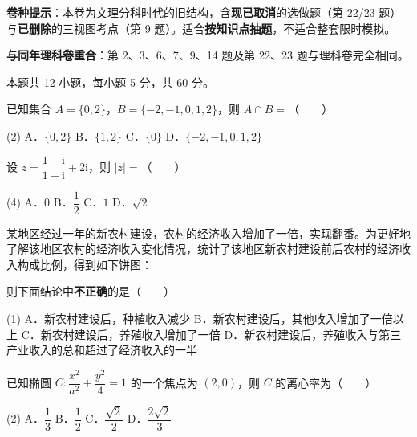 

\begin{gknotice}
\textbf{ 卷种提示}：本卷为文理分科时代的旧结构，含\textbf{现已取消}的选做题（第 22/23 题）与\textbf{已删除}的三视图考点（第 9 题）。适合\textbf{按知识点抽题}，不适合整套限时模拟。

\textbf{与同年理科卷重合}：第 2、3、6、7、9、14 题及第 22、23 题与理科卷完全相同。
\end{gknotice}

\par\medskip


\begin{gktip}
本题共 12 小题，每小题 5 分，共 60 分。
\end{gktip}

已知集合 $A=\{0,2\}$，$B=\{-2,-1,0,1,2\}$，则 $A\cap B=$（　　）

\begin{gkopts}(2)
\task A．$\{0,2\}$
\task B．$\{1,2\}$
\task C．$\{0\}$
\task D．$\{-2,-1,0,1,2\}$
\end{gkopts}

设 $z=\dfrac{1-\mathrm i}{1+\mathrm i}+2\mathrm i$，则 $|z|=$（　　）

\begin{gkopts}(4)
\task A．$0$
\task B．$\dfrac12$
\task C．$1$
\task D．$\sqrt2$
\end{gkopts}

某地区经过一年的新农村建设，农村的经济收入增加了一倍，实现翻番。为更好地了解该地区农村的经济收入变化情况，统计了该地区新农村建设前后农村的经济收入构成比例，得到如下饼图：

\begin{center}\end{center}

则下面结论中\textbf{不正确}的是（　　）

\begin{gkopts}(1)
\task A．新农村建设后，种植收入减少
\task B．新农村建设后，其他收入增加了一倍以上
\task C．新农村建设后，养殖收入增加了一倍
\task D．新农村建设后，养殖收入与第三产业收入的总和超过了经济收入的一半
\end{gkopts}

已知椭圆 $C:\dfrac{x^{2}}{a^{2}}+\dfrac{y^{2}}4=1$ 的一个焦点为 $(2,0)$，则 $C$ 的离心率为（　　）

\begin{gkopts}(2)
\task A．$\dfrac13$
\task B．$\dfrac12$
\task C．$\dfrac{\sqrt2}2$
\task D．$\dfrac{2\sqrt2}3$
\end{gkopts}

